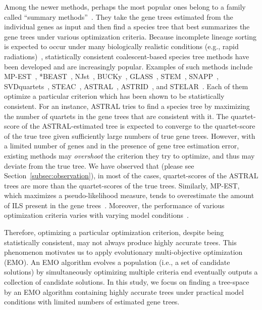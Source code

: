 Among the newer methods, perhaps the most popular ones belong to a family called ``summary methods''~\cite{bayzid2013naive}. They take the gene trees estimated from the individual genes as input and then find a species tree that best summarizes the gene trees under various optimization criteria. 
Because incomplete lineage sorting is
expected to occur under many biologically realistic conditions (e.g., rapid radiations)~\cite{jarvis2014whole}, statistically consistent coalescent-based species tree methods have been developed and are increasingly popular. 
Examples of such methods include
MP-EST~\cite{mpest}, *BEAST~\cite{heled-drummond}, NJst~\cite{njst}, BUCKy~\cite{larget-bioinf2010}, GLASS~\cite{glass}, STEM~\cite{stem}, SNAPP~\cite{snapp}, SVDquartets~\cite{svdquartet}, STEAC~\cite{steac},
ASTRAL~\cite{mirarab2014astral}, ASTRID~\cite{vachaspati2015astrid}, and STELAR~\cite{islam2019stelar}. Each of them optimize a particular criterion which has been shown to be statistically consistent. For an instance, ASTRAL tries to find a species tree by maximizing the number of quartets in the gene trees that are consistent with it. The quartet-score of the ASTRAL-estimated tree is expected to converge to the quartet-score of the true tree given sufficiently large numbers of true gene trees. However, with a limited number of genes and in the presence of gene tree estimation error, existing methods may \textit{overshoot} the criterion they try to optimize, and thus may deviate from the true tree. We have observed that (please see Section~\ref{subsec:observation}), in most of the cases, quartet-scores of the ASTRAL trees are more than the quartet-scores of the true trees. Similarly, MP-EST, which maximizes a pseudo-likelihood measure, tends to overestimate the amount of ILS present in the gene trees~\cite{statistical-binning,bayzid2015weighted}. Moreover, the performance of various optimization criteria varies with varying model conditions~\cite{mirarab2014evaluating,chou2015comparative}.


Therefore, optimizing a particular optimization criterion, despite being statistically consistent, may not always produce highly accurate trees. This phenomenon motivates us to apply evolutionary multi-objective optimization (EMO). An EMO algorithm evolves a population (i.e., a set of candidate solutions) by simultaneously optimizing multiple criteria end eventually outputs a collection of candidate solutions. 
In this study, we focus on finding a tree-space by an EMO algorithm containing highly accurate trees under practical model conditions with limited numbers of estimated gene trees. 


